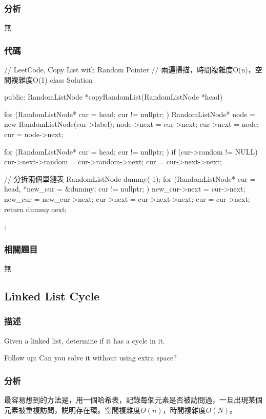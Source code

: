 \subsubsection{分析}
無


\subsubsection{代碼}
\begin{Code}
// LeetCode, Copy List with Random Pointer
// 兩遍掃描，時間複雜度O(n)，空間複雜度O(1)
class Solution {
public:
    RandomListNode *copyRandomList(RandomListNode *head) {
        for (RandomListNode* cur = head; cur != nullptr; ) {
            RandomListNode* node = new RandomListNode(cur->label);
            node->next = cur->next;
            cur->next = node;
            cur = node->next;
        }

        for (RandomListNode* cur = head; cur != nullptr; ) {
            if (cur->random != NULL)
                cur->next->random = cur->random->next;
            cur = cur->next->next;
        }

        // 分拆兩個單鏈表
        RandomListNode dummy(-1);
        for (RandomListNode* cur = head, *new_cur = &dummy;
                cur != nullptr; ) {
            new_cur->next = cur->next;
            new_cur = new_cur->next;
            cur->next = cur->next->next;
            cur = cur->next;
        }
        return dummy.next;
    }
};
\end{Code}


\subsubsection{相關題目}
\begindot
\item 無
\myenddot


\subsection{Linked List Cycle}
\label{sec:linked-list-cycle}


\subsubsection{描述}
Given a linked list, determine if it has a cycle in it.

Follow up:
Can you solve it without using extra space?


\subsubsection{分析}
最容易想到的方法是，用一個哈希表，記錄每個元素是否被訪問過，一旦出現某個元素被重複訪問，説明存在環。空間複雜度$O(n)$，時間複雜度$O(N)$。

